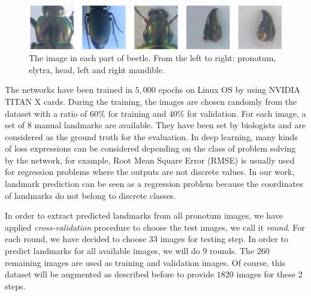 \documentclass[review]{elsarticle}
\begin{document}
\begin{figure}[h]
	\centering
	\includegraphics[scale=0.25]{images/images5parts}
	\caption{The image in each part of beetle. From the left to right: pronotum, elytra, head, left and right mandible.}
	\label{fig5parts}
\end{figure}

The networks have been trained in $5, 000$ epochs on Linux OS by using NVIDIA TITAN X cards. During the training, the images are chosen randomly from the dataset with a ratio of $60\%$ for training and $40\%$ for validation. For each image, a set of $8$ manual landmarks are available. They have been set by biologists and are considered as the ground truth for the evaluation. In deep learning, many kinds of loss expressions can be considered depending on the class of problem solving by the network, for example, Root Mean Square Error (RMSE) is usually used for regression problems where the outputs are not discrete values. In our work, landmark prediction can be seen as a regression problem because the coordinates of landmarks do not belong to discrete classes.

In order to extract predicted landmarks from all pronotum images, we have applied \textit{cross-validation} procedure to choose the test images, we call it \textit{round}. For each round, we have decided to choose $33$ images for testing step. In order to predict landmarks for all available images, we will do $9$ rounds. The $260$ remaining images are used as training and validation images. Of course, this dataset will be augmented as described before to provide $1820$ images for these $2$ steps. 
\end{document}
